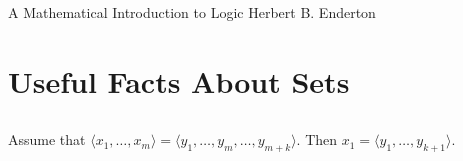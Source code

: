 \documentclass{report}
\begin{document}
\header
  {A Mathematical Introduction to Logic}
  {Herbert B. Enderton}

\tableofcontents

\setcounter{chapter}{0}
\addtocounter{chapter}{-1}

\chapter{Useful Facts About Sets}%
\label{chap:useful-facts-about-sets}

\section{}%
\label{sec:lemma-0a}

Assume that $\langle x_1, \ldots, x_m \rangle =
  \langle y_1, \ldots, y_m, \ldots, y_{m+k} \rangle$.
Then $x_1 = \langle y_1, \ldots, y_{k+1} \rangle$.
\end{document}
